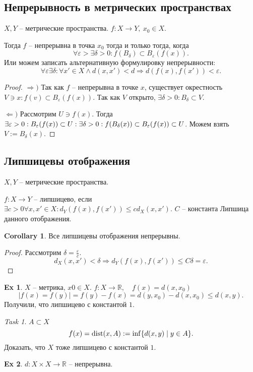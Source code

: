 \documentclass[11pt]{book}
\newcommand{\R}{\mathbb{R}}
\newcommand{\dist}{{\mathop{\text{\rm dist}}}}
\renewcommand{\le}{\leqslant}
\theoremstyle{definition}
\theoremstyle{plain}
\theoremstyle{plain}
\theoremstyle{definition}
\newtheorem*{ex}{Ex}
\newtheorem*{cor}{Corollary}
\theoremstyle{remark}
\newtheorem*{task}{Task}
\begin{document}
\subsection{Непрерывность в метрических пространствах}
\begin{thm}
    $X, Y$ -- метрические пространства.  $f: X \to  Y, ~ x_0 \in  X$.

    Тогда $f$ -- непрерывна в точка $x_0$ тогда и только тогда, когда
    \[
	\forall  \varepsilon > \exists  \delta  >0: f(B_{ \delta }) \subset B_{ \varepsilon } (f(x))
    .\]
    Или можем записать альтернативную формулировку непрерывности:
    \[
	\forall  \varepsilon  \exists \delta : \forall x' \in  X \wedge d(x, x') < d \Rightarrow  d(f(x) , f(x')) < \varepsilon
    .\]
\end{thm}
\begin{proof}
    $ \Rightarrow )$ Так как $f$ -- непрерывна в точке $x$, существует окрестность $V \ni x: f(v) \subset  B_{ \varepsilon }(f(x))$. Так как $V$ открыто, $\exists  \delta >0 : B_{ \delta } \subset  V$.

    $ \Leftarrow )$ Рассмотрим $U \ni f(x)$.
    Тогда $\exists  \varepsilon >0: B_{ \varepsilon }(f(x)) \subset U: \\
    \exists \delta  >0 : f(B_{\delta}(x)) \subset  B_{ \varepsilon } (f(x)) \subset  U$.
    Можем взять  $V:=B_{ \delta } (x)$.
\end{proof}
\subsection{Липшицевы отображения}
\begin{defn}
    $X, Y$ -- метрические пространства.

    $f: X \to  Y$ -- липшицево, если $\exists c > 0 \forall  x, x' \in  X: d_Y(f(x), f(x')) \le c d_X(x, x')$. $C$ -- константа Липшица данного отображения.
\end{defn}
\begin{cor}
    Все липшицевы отображения непрерывны.
\end{cor}
\begin{proof}
    Рассмотрим $ \delta = \frac{\varepsilon}{c}$.
    \[
	d_X(x, x') < \delta  \Rightarrow d_Y(f(x), f(x')) \le C \delta = \varepsilon
    .\]
\end{proof}
\begin{ex}
    $X $ -- метрика, $x0 \in  X$.
    $f: X \to  \R, \quad f(x) = d(x, x_0)$
    \[
	|f(x) = f(y)| = f(y) - f(x) = d(y, x_0) - d(x, x_0) \le d(x, y)
    .\]
    Получили, что липшицево с константой $1$.
\end{ex}
\begin{task}
    $A \subset  X$
    \[
	f(x) = \dist(x, A) := \inf \{d(x, y) \mid y \in  A\}
    .\]
    Доказать, что $X$ тоже липшицево с константой $1$.
\end{task}
\begin{ex}
    $d : X \times X \to  \R$ -- непрерывна.
\end{ex}
\end{document}
